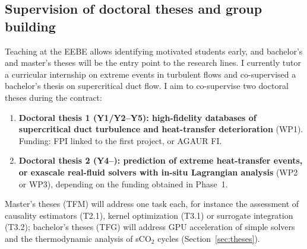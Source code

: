 \documentclass[11pt]{article}
\begin{document}
\subsection{Supervision of doctoral theses and group building}
Teaching at the EEBE allows identifying motivated students early, and bachelor's and
master's theses will be the entry point to the research lines. I currently tutor a
curricular internship on extreme events in turbulent flows and co-supervised a bachelor's
thesis on supercritical duct flow. I aim to co-supervise two doctoral theses during the
contract:
\begin{enumerate}
  \item \textbf{Doctoral thesis 1 (Y1/Y2--Y5): high-fidelity databases of supercritical duct
  turbulence and heat-transfer deterioration} (WP1). Funding: FPI linked to the first project,
  or AGAUR FI.
  \item \textbf{Doctoral thesis 2 (Y4--): prediction of extreme heat-transfer events, or
  exascale real-fluid solvers with in-situ Lagrangian analysis} (WP2 or WP3), depending on the
  funding obtained in Phase~1.
\end{enumerate}
Master's theses (TFM) will address one task each, for instance the assessment of causality
estimators (T2.1), kernel optimization (T3.1) or surrogate integration (T3.2); bachelor's
theses (TFG) will address GPU acceleration of simple solvers and the thermodynamic analysis of
sCO$_2$ cycles (Section~\ref{sec:theses}).
\end{document}

